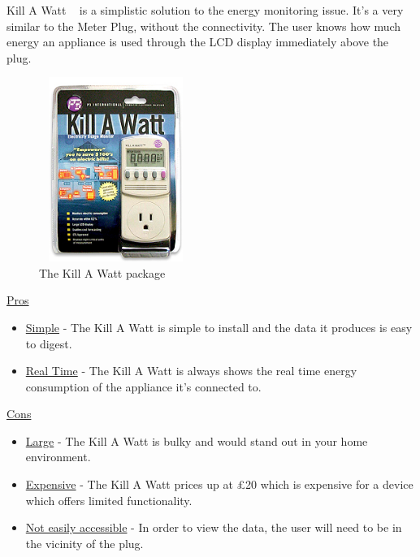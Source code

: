 \documentclass[preprint,12pt,3p]{elsarticle}
\begin{document}
Kill A Watt ~\cite{killawatt} is a simplistic solution to the energy monitoring issue. It's a very similar to the Meter Plug, without the connectivity. The user knows how much energy an appliance is used through the LCD display immediately above the plug.

\begin{figure}[h]
    \centering
    \includegraphics[width=5cm, height=6cm]{existing/killawatt}
    \caption {The Kill A Watt package}
\end{figure}

\begin{center}
    \underline{Pros}
    \begin{itemize}
      \item \underline{Simple} - The Kill A Watt is simple to install and the data it produces is easy to digest.
      \item \underline{Real Time} - The Kill A Watt is always shows the real time energy consumption of the appliance it's connected to.
    \end{itemize}
    
    \underline{Cons}
    
    \begin{itemize}
      \item \underline{Large} - The Kill A Watt is bulky and would stand out in your home environment.
      \item \underline{Expensive} - The Kill A Watt prices up at \pounds20 which is expensive for a device which offers limited functionality.
      \item \underline{Not easily accessible} - In order to view the data, the user will need to be in the vicinity of the plug.
    \end{itemize}
    
\end{center}
\end{document}
